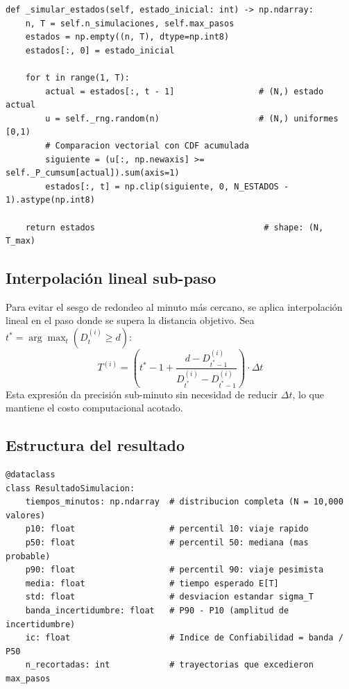 \documentclass[11pt,a4paper]{article}
\begin{document}
\begin{lstlisting}[caption={Generación vectorizada de estados Markov por transformada inversa.},label={lst:vectorizado}]
def _simular_estados(self, estado_inicial: int) -> np.ndarray:
    n, T = self.n_simulaciones, self.max_pasos
    estados = np.empty((n, T), dtype=np.int8)
    estados[:, 0] = estado_inicial

    for t in range(1, T):
        actual = estados[:, t - 1]                 # (N,) estado actual
        u = self._rng.random(n)                    # (N,) uniformes [0,1)
        # Comparacion vectorial con CDF acumulada
        siguiente = (u[:, np.newaxis] >= self._P_cumsum[actual]).sum(axis=1)
        estados[:, t] = np.clip(siguiente, 0, N_ESTADOS - 1).astype(np.int8)

    return estados                                  # shape: (N, T_max)
\end{lstlisting}

\subsection{Interpolación lineal sub-paso}

Para evitar el sesgo de redondeo al minuto más cercano, se aplica interpolación lineal en el paso donde se supera la distancia objetivo. Sea $t^* = \arg\max_t (D_t^{(i)} \geq d)$:
\begin{equation}
T^{(i)} = \left( t^* - 1 + \frac{d - D_{t^*-1}^{(i)}}{D_{t^*}^{(i)} - D_{t^*-1}^{(i)}} \right) \cdot \Delta t
\label{eq:interpol}
\end{equation}
Esta expresión da precisión sub-minuto sin necesidad de reducir $\Delta t$, lo que mantiene el costo computacional acotado.

\subsection{Estructura del resultado}

\begin{lstlisting}[caption={\texttt{ResultadoSimulacion}: dataclass de salida del motor.},label={lst:resultado}]
@dataclass
class ResultadoSimulacion:
    tiempos_minutos: np.ndarray  # distribucion completa (N = 10,000 valores)
    p10: float                   # percentil 10: viaje rapido
    p50: float                   # percentil 50: mediana (mas probable)
    p90: float                   # percentil 90: viaje pesimista
    media: float                 # tiempo esperado E[T]
    std: float                   # desviacion estandar sigma_T
    banda_incertidumbre: float   # P90 - P10 (amplitud de incertidumbre)
    ic: float                    # Indice de Confiabilidad = banda / P50
    n_recortadas: int            # trayectorias que excedieron max_pasos
\end{lstlisting}
\end{document}
